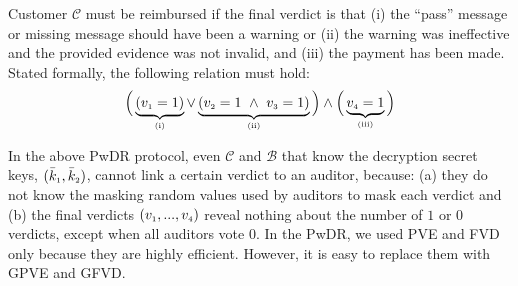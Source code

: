 Customer $\mathcal{C}$ must be reimbursed if the final verdict is that (i)  the ``pass'' message or  missing message should have been a warning or (ii)  the warning was ineffective and the provided evidence was not invalid, and (iii) the payment has been made. Stated formally, the following relation must hold: 
%
$$\Big( \underbrace{(v_{\scriptscriptstyle 1}=1)}_{\scriptscriptstyle (\text{i})}\vee  \underbrace{(v_{\scriptscriptstyle 2}=1\ \wedge\ v_{\scriptscriptstyle 3}=1)}_{\scriptscriptstyle (\text {ii})}\Big)\wedge\Big(\underbrace{v_{\scriptscriptstyle 4}=1}_{\scriptscriptstyle (\text{iii})}\Big)$$
%
%
%
%
%




In the above PwDR protocol, even $\mathcal{C}$ and $\mathcal{B}$ that know the decryption secret keys, $(\bar k_{\scriptscriptstyle 1}, \bar k_{\scriptscriptstyle 2})$, cannot link a certain verdict to an auditor, because:  (a) they do not know the masking random values used by auditors to mask each verdict and (b) the final verdicts $(v_{\scriptscriptstyle 1},..., v_{\scriptscriptstyle 4})$ reveal nothing about the number of $1$ or $0$ verdicts, except when all auditors vote $0$.   In the PwDR, we used PVE and FVD only because they are highly efficient. However, it is easy to replace them with GPVE and GFVD. 

